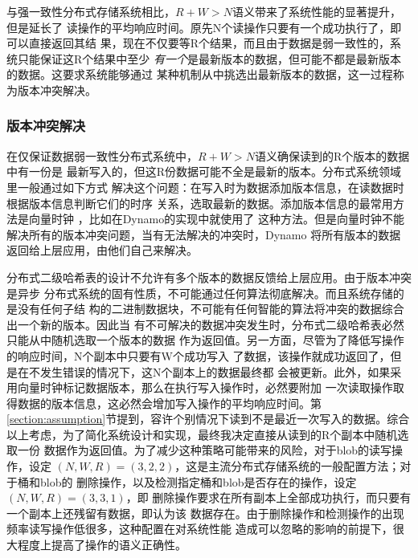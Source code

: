 与强一致性分布式存储系统相比，$R+W>N$语义带来了系统性能的显著提升，但是延长了
读操作的平均响应时间。原先N个读操作只要有一个成功执行了，即可以直接返回其结
果，现在不仅要等R个结果，而且由于数据是弱一致性的，系统只能保证这R个结果中至少
\emph{有一个}是最新版本的数据，但可能不都是最新版本的数据。这要求系统能够通过
某种机制从中挑选出最新版本的数据，这一过程称为版本冲突解决。

\subsubsection{版本冲突解决}
在仅保证数据弱一致性分布式系统中，$R+W>N$语义确保读到的R个版本的数据中有一份是
最新写入的，但这R份数据可能不全是最新的版本。分布式系统领域里一般通过如下方式
解决这个问题：在写入时为数据添加版本信息，在读数据时根据版本信息判断它们的时序
关系，选取最新的数据。添加版本信息的最常用方法是向量时钟
\cite{lamport1978time}，比如在Dynamo\cite{hastorun2007dynamo}的实现中就使用了
这种方法。但是向量时钟不能解决所有的版本冲突问题，当有无法解决的冲突时，Dynamo
将所有版本的数据返回给上层应用，由他们自己来解决。

分布式二级哈希表的设计不允许有多个版本的数据反馈给上层应用。由于版本冲突是异步
分布式系统的固有性质，不可能通过任何算法彻底解决。而且系统存储的是没有任何子结
构的二进制数据块，不可能有任何智能的算法将冲突的数据综合出一个新的版本。因此当
有不可解决的数据冲突发生时，分布式二级哈希表必然只能从中随机选取一个版本的数据
作为返回值。另一方面，尽管为了降低写操作的响应时间，N个副本中只要有W个成功写入
了数据，该操作就成功返回了，但是在不发生错误的情况下，这N个副本上的数据最终都
会被更新。此外，如果采用向量时钟标记数据版本，那么在执行写入操作时，必然要附加
一次读取操作取得数据的版本信息，这必然会增加写入操作的平均响应时间。第
\ref{section:assumption}节提到，容许个别情况下读到不是最近一次写入的数据。综合
以上考虑，为了简化系统设计和实现，最终我决定直接从读到的R个副本中随机选取一份
数据作为返回值。为了减少这种策略可能带来的风险，对于blob的读写操作，设定
$(N, W, R) = (3, 2, 2)$，这是主流分布式存储系统的一般配置方法；对于桶和blob的
删除操作，以及检测指定桶和blob是否存在的操作，设定$(N, W, R) = (3, 3, 1)$，即
删除操作要求在所有副本上全部成功执行，而只要有一个副本上还残留有数据，即认为该
数据存在。由于删除操作和检测操作的出现频率读写操作低很多，这种配置在对系统性能
造成可以忽略的影响的前提下，很大程度上提高了操作的语义正确性。

